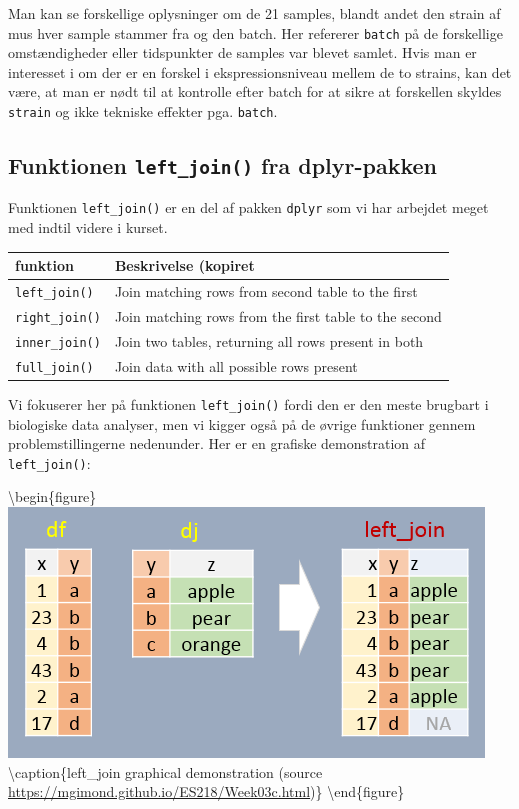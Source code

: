 \documentclass[
]{book}
\begin{document}
Man kan se forskellige oplysninger om de 21 samples, blandt andet den strain af mus hver sample stammer fra og den batch. Her refererer \texttt{batch} på de forskellige omstændigheder eller tidspunkter de samples var blevet samlet. Hvis man er interesset i om der er en forskel i ekspressionsniveau mellem de to strains, kan det være, at man er nødt til at kontrolle efter batch for at sikre at forskellen skyldes \texttt{strain} og ikke tekniske effekter pga. \texttt{batch}.

\hypertarget{funktionen-left_join-fra-dplyr-pakken}{%
\subsection{\texorpdfstring{Funktionen \texttt{left\_join()} fra dplyr-pakken}{Funktionen left\_join() fra dplyr-pakken}}\label{funktionen-left_join-fra-dplyr-pakken}}

Funktionen \texttt{left\_join()} er en del af pakken \texttt{dplyr} som vi har arbejdet meget med indtil videre i kurset.

\begin{longtable}[]{@{}ll@{}}
\toprule
funktion & Beskrivelse (kopiret \\
\midrule
\endhead
\texttt{left\_join()} & Join matching rows from second table to the first \\
\texttt{right\_join()} & Join matching rows from the first table to the second \\
\texttt{inner\_join()} & Join two tables, returning all rows present in both \\
\texttt{full\_join()} & Join data with all possible rows present \\
\bottomrule
\end{longtable}

Vi fokuserer her på funktionen \texttt{left\_join()} fordi den er den meste brugbart i biologiske data analyser, men vi kigger også på de øvrige funktioner gennem problemstillingerne nedenunder. Her er en grafiske demonstration af \texttt{left\_join()}:

\textbackslash begin\{figure\}
\includegraphics[width=0.6\linewidth]{plots/left_join} \textbackslash caption\{left\_join graphical demonstration (source \url{https://mgimond.github.io/ES218/Week03c.html})\}\label{fig:unnamed-chunk-320}
\textbackslash end\{figure\}
\end{document}
